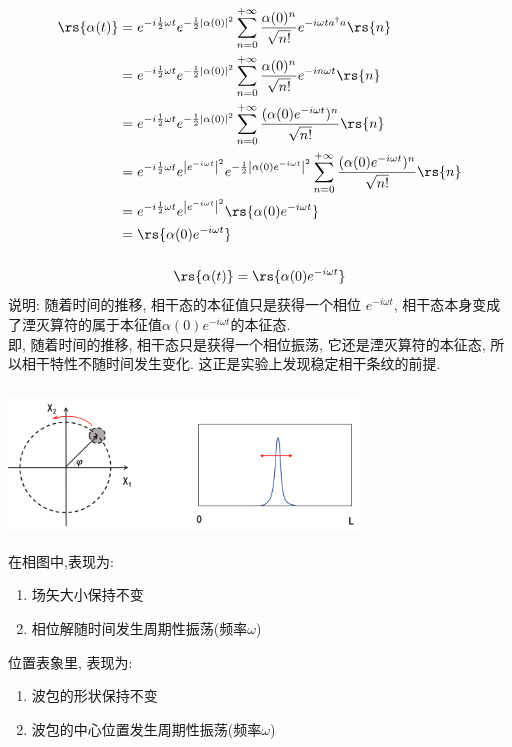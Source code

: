 \begin{frame}
    \frametitle{}
    \[ \begin{aligned}
        \rs{\alpha (t)} &= e^{-i\frac{1}{2} \omega t}  e^{-\frac{1}{2}\left|\alpha(0)\right|^2} \sum_{n=0} ^{+\infty}  \frac{\alpha(0)^n}{\sqrt{n!}} e^{-i \omega t  a^\dagger a}  \rs{n}  \\
        &= e^{-i\frac{1}{2} \omega t}  e^{-\frac{1}{2}\left|\alpha(0)\right|^2}\sum_{n=0} ^{+\infty}  \frac{\alpha(0)^n}{\sqrt{n!}} e^{-i n \omega t }  \rs{n}  \\ 
        &= e^{-i\frac{1}{2} \omega t}  e^{-\frac{1}{2}\left|\alpha(0)\right|^2} \sum_{n=0} ^{+\infty}  \frac{(\alpha(0) e^{-i \omega t })^n}{\sqrt{n!}} \rs{n}  \\ 
        &= e^{-i\frac{1}{2} \omega t} e^{\left|e^{-i \omega t }\right|^2}   e^{-\frac{1}{2}\left|\alpha(0)e^{-i \omega t }\right|^2} \sum_{n=0} ^{+\infty}  \frac{(\alpha(0) e^{-i \omega t })^n}{\sqrt{n!}} \rs{n}  \\ 
        &= e^{-i\frac{1}{2} \omega t}  e^{\left|e^{-i \omega t }\right|^2}  \rs{\alpha(0) e^{-i \omega t} } \\ 
        &= \rs{\alpha(0) e^{-i \omega t}} \\ 
       \end{aligned}\]
\end{frame}

\begin{frame}
      \frametitle{}
      \[ \rs{\alpha (t)}= \rs{\alpha(0) e^{-i \omega t}}  \]
       说明: 随着时间的推移, 相干态的本征值只是获得一个相位 $e^{-i \omega t}$, 相干态本身变成了湮灭算符的属于本征值$ \alpha(0) e^{-i \omega t} $的本征态. \\ {\vspace*{0.6em}} 
       即, 随着时间的推移, 相干态只是获得一个相位振荡, 它还是湮灭算符的本征态, 所以相干特性不随时间发生变化. 这正是实验上发现稳定相干条纹的前提.
\end{frame}

\begin{frame}
 \frametitle{}
   \begin{center}
        \includegraphics[width=0.7\textwidth]{figs/5.png}
   \end{center}
    在相图中,表现为:
 \begin{enumerate}
     \item 场矢大小保持不变
     \item 相位解随时间发生周期性振荡(频率$\omega$)
 \end{enumerate}
  位置表象里, 表现为: 
  \begin{enumerate}
    \item 波包的形状保持不变
    \item 波包的中心位置发生周期性振荡(频率$\omega$)
\end{enumerate}   
\end{frame}


